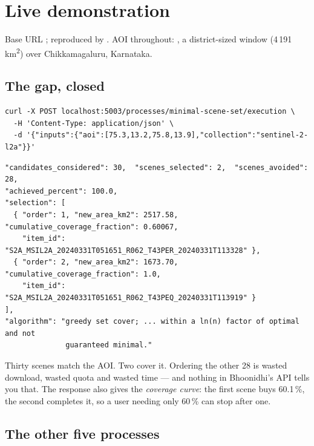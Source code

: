 \section{Live demonstration}
\label{sec:results}

Base URL ; reproduced by .
AOI throughout: \code{[75.3, 13.2, 75.8, 13.9]}, a district-sized window
(4\,191\,km\textsuperscript{2}) over Chikkamagaluru, Karnataka.

\subsection{The gap, closed}

\begin{lstlisting}
curl -X POST localhost:5003/processes/minimal-scene-set/execution \
  -H 'Content-Type: application/json' \
  -d '{"inputs":{"aoi":[75.3,13.2,75.8,13.9],"collection":"sentinel-2-l2a"}}'
\end{lstlisting}

\begin{lstlisting}[style=json]
"candidates_considered": 30,  "scenes_selected": 2,  "scenes_avoided": 28,
"achieved_percent": 100.0,
"selection": [
  { "order": 1, "new_area_km2": 2517.58, "cumulative_coverage_fraction": 0.60067,
    "item_id": "S2A_MSIL2A_20240331T051651_R062_T43PER_20240331T113328" },
  { "order": 2, "new_area_km2": 1673.70, "cumulative_coverage_fraction": 1.0,
    "item_id": "S2A_MSIL2A_20240331T051651_R062_T43PEQ_20240331T113919" }
],
"algorithm": "greedy set cover; ... within a ln(n) factor of optimal and not
              guaranteed minimal."
\end{lstlisting}

\begin{keyfinding}{Thirty scenes match the AOI. Two cover it.}
Ordering the other 28 is wasted download, wasted quota and wasted time --- and
nothing in Bhoonidhi's API tells you that. The response also gives the
\emph{coverage curve}: the first scene buys 60.1\,\%, the second completes it,
so a user needing only 60\,\% can stop after one.
\end{keyfinding}

\subsection{The other five processes}

